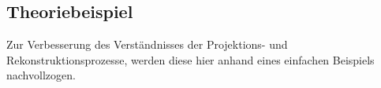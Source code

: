 \documentclass[slug=PET, room=Andreas-Schubert-Bau\,\ 424A, supervisor=Carsten\ Bittrich, coursedate=10.\ 01.\ 2020]{../../Lab_Report_LaTeX/lab_report}
\begin{document}


\subsection{Theoriebeispiel}
\label{sec:theobei}
Zur Verbesserung des Verst\"andnisses der Projektions- und
Rekonstruktionsprozesse, werden diese hier anhand eines einfachen
Beispiels nachvollzogen.
\end{document}
